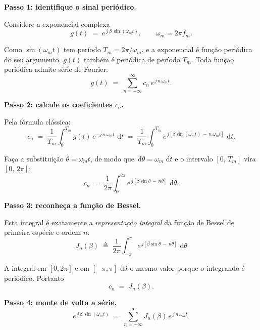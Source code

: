 \documentclass[11pt,a4paper]{article}
\newcommand{\dd}{\,\mathrm{d}}
\begin{document}
\begin{quadro}
\textbf{Passo 1: identifique o sinal periódico.}

Considere a exponencial complexa
\[
  g(t) \;=\; e^{\,j\,\beta\,\sin(\omega_m t)}, \qquad \omega_m = 2\pi f_m.
\]

Como $\sin(\omega_m t)$ tem período $T_m = 2\pi/\omega_m$, e a exponencial é função periódica do seu argumento, $g(t)$ também é periódica de período $T_m$. Toda função periódica admite série de Fourier:
\[
  g(t) \;=\; \sum_{n=-\infty}^{\infty} c_n\,e^{\,j\,n\,\omega_m t}.
\]

\textbf{Passo 2: calcule os coeficientes $c_n$.}

Pela fórmula clássica:
\[
  c_n \;=\; \frac{1}{T_m}\!\int_{0}^{T_m}\! g(t)\,e^{-j\,n\,\omega_m t}\,\dd t
       \;=\; \frac{1}{T_m}\!\int_{0}^{T_m}\! e^{\,j[\beta\sin(\omega_m t)\,-\,n\,\omega_m t]}\,\dd t.
\]

Faça a substituição $\theta = \omega_m t$, de modo que $\dd\theta = \omega_m\,\dd t$ e o intervalo $[0,\,T_m]$ vira $[0,\,2\pi]$:
\[
  c_n \;=\; \frac{1}{2\pi}\!\int_{0}^{2\pi}\! e^{\,j[\beta\sin\theta\,-\,n\theta]}\,\dd\theta.
\]

\textbf{Passo 3: reconheça a função de Bessel.}

Esta integral é exatamente a \emph{representação integral} da função de Bessel de primeira espécie e ordem $n$:
\[
  \boxed{\;J_n(\beta) \;\triangleq\; \frac{1}{2\pi}\!\int_{-\pi}^{\pi}\! e^{\,j[\beta\sin\theta\,-\,n\theta]}\,\dd\theta\;}
\]

A integral em $[0,2\pi]$ e em $[-\pi,\pi]$ dá o mesmo valor porque o integrando é periódico. Portanto
\[
  c_n \;=\; J_n(\beta).
\]

\textbf{Passo 4: monte de volta a série.}
\[
  e^{\,j\,\beta\,\sin(\omega_m t)} \;=\; \sum_{n=-\infty}^{\infty} J_n(\beta)\,e^{\,j\,n\,\omega_m t}.
\]
\end{quadro}
\end{document}
